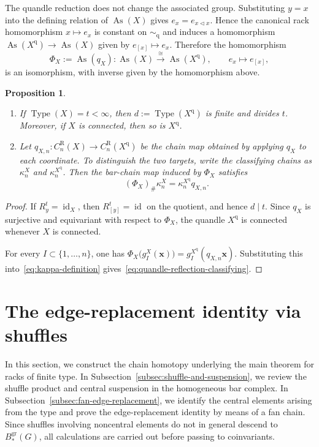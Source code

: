 \documentclass[10pt,a4paper]{amsart}
\newtheorem{proposition}[theorem]{Proposition}
\DeclareMathOperator{\As}{As}
\DeclareMathOperator{\Type}{Type}
\newcommand{\gr}{\mathrm{gr}}
\newcommand{\R}{\mathrm R}
\begin{document}
The quandle reduction does not change the associated group. Substituting $y=x$ into the defining relation of $\As(X)$ gives $e_x=e_{x\lhd x}$. Hence the canonical rack homomorphism $x\mapsto e_x$ is constant on $\sim_{\mathrm q}$ and induces a homomorphism $\As(X^{\mathrm q})\to\As(X)$ given by $e_{[x]}\mapsto e_x$. Therefore the homomorphism
\[
 \Phi_X:=\As(q_X)\colon
 \As(X)\xrightarrow{\cong}\As(X^{\mathrm q}),
 \qquad e_x\longmapsto e_{[x]},
\]
is an isomorphism, with inverse given by the homomorphism above.

\begin{proposition}%
\label{prop:quandle-reflection}
\begin{enumerate}[label=(\arabic*)]
\item If $\Type(X)=t<\infty$, then $d:=\Type(X^{\mathrm q})$ is finite and divides $t$. Moreover, if $X$ is connected, then so is $X^{\mathrm q}$.
\item Let $q_{X,n}\colon C_n^\R(X)\to C_n^\R(X^{\mathrm q})$ be the chain map obtained by applying $q_X$ to each coordinate. To distinguish the two targets, write the classifying chains as $\kappa_n^X$ and $\kappa_n^{X^{\mathrm q}}$. Then the bar-chain map induced by $\Phi_X$ satisfies
\begin{equation}
 (\Phi_X)_\#\kappa_n^X
 =\kappa_n^{X^{\mathrm q}}q_{X,n}.
 \label{eq:quandle-reflection-classifying}
\end{equation}
\end{enumerate}
\end{proposition}

\begin{proof}
If $R_y^t=\operatorname{id}_X$, then $R_{[y]}^t=\operatorname{id}$ on the quotient, and hence $d\mid t$. Since $q_X$ is surjective and equivariant with respect to $\Phi_X$, the quandle $X^{\mathrm q}$ is connected whenever $X$ is connected.

For every $I\subset\{1,\ldots,n\}$, one has $\Phi_X\bigl(g_I^X(\mathbf x)\bigr)=g_I^{X^{\mathrm q}}(q_{X,n}\mathbf x)$. Substituting this into~\eqref{eq:kappa-definition} gives~\eqref{eq:quandle-reflection-classifying}.
\end{proof}

\section{The edge-replacement identity via shuffles}

In this section, we construct the chain homotopy underlying the main theorem for racks of finite type. In Subsection~\ref{subsec:shuffle-and-suspension}, we review the shuffle product and central suspension in the homogeneous bar complex. In Subsection~\ref{subsec:fan-edge-replacement}, we identify the central elements arising from the type and prove the edge-replacement identity by means of a fan chain. Since shuffles involving noncentral elements do not in general descend to $B_*^{\gr}(G)$, all calculations are carried out before passing to coinvariants.
\end{document}
